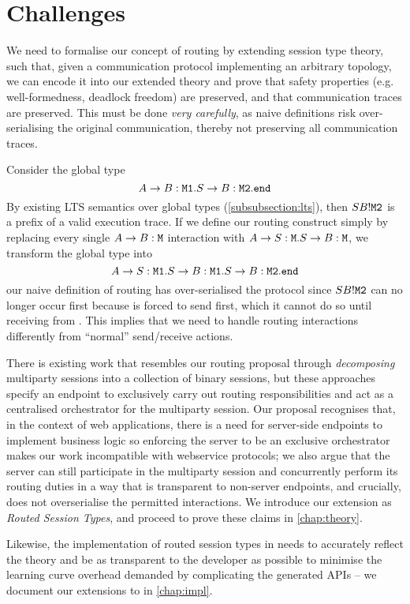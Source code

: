 \section{Challenges}
\label{section:routerchallenges}

We need to formalise our concept of routing by extending session
type theory, such that, given a communication protocol implementing 
an arbitrary topology, we can encode it into our extended theory and
prove that safety properties (e.g. well-formedness, deadlock freedom)
are preserved, and that communication traces are preserved.
This must be done \textit{very carefully}, as
naive definitions risk over-serialising the original communication,
thereby not preserving all communication traces.

\begin{example}
Consider the global type
\[
A \to B: \texttt{M1}. S \to B: \texttt{M2}. \texttt{end}
\]
By existing LTS semantics over
global types (\cref{subsubsection:lts}), then $SB!\texttt{M2}$
is a prefix of a valid execution trace.
If we define our routing construct simply by replacing every single
$A \to B: \texttt{M}$ interaction with $A \to S: \texttt{M}.
S \to B: \texttt{M}$, we transform the global type into
\[
A \to S: \texttt{M1}. S \to B: \texttt{M1}. S \to B: \texttt{M2}. \texttt{end}
\]
our naive definition of routing has over-serialised the protocol
since $SB!\texttt{M2}$ can no longer occur first because 
is forced to send  first, which it cannot do so until receiving
from .
This implies that we need to handle routing interactions differently
from ``normal'' send/receive actions.
\end{example}

There is existing work \cite{LinearDecomp, BinaryDecomp, BinaryDuality}
that resembles our routing proposal through
\textit{decomposing} multiparty sessions into a collection
of binary sessions,
but these approaches
specify an endpoint to exclusively carry out
routing responsibilities and act as a centralised orchestrator 
for the multiparty session.
Our proposal recognises that, in the context of web applications,
there is a need for server-side endpoints to implement business logic
so enforcing the server to be an exclusive orchestrator makes our work
incompatible with webservice protocols; 
we also argue that the server can still participate in the 
multiparty session and concurrently perform its routing duties
in a way that is transparent to non-server endpoints, and crucially,
does not overserialise the permitted interactions. 
We introduce our extension as \textit{Routed Session Types},
and proceed to prove these claims in \cref{chap:theory}.

Likewise, the implementation of routed session types 
in  needs to accurately reflect the theory
and be as transparent to the developer as possible to minimise
the learning curve overhead demanded 
by complicating the generated APIs -- we document our extensions
to  in \cref{chap:impl}.